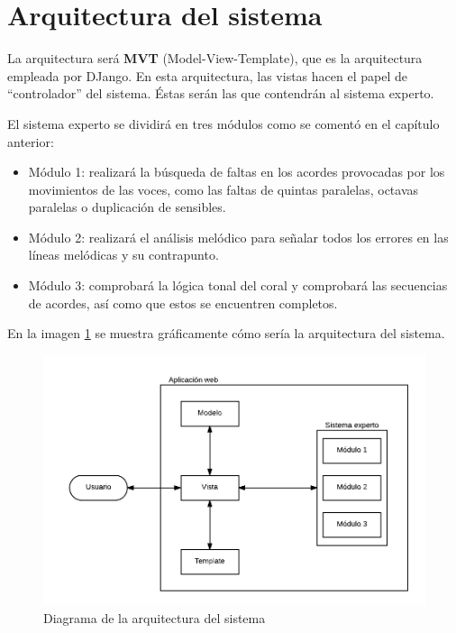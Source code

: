 \section{Arquitectura del sistema}

La arquitectura será \textbf{MVT} (Model-View-Template), que es la arquitectura empleada por DJango. En esta arquitectura, las vistas hacen el papel de ``controlador'' del sistema. Éstas serán las que contendrán al sistema experto.  

El sistema experto se dividirá en tres módulos como se comentó en el capítulo anterior:

\begin{itemize}

	\item Módulo 1: realizará la búsqueda de faltas en los acordes provocadas por los movimientos de las voces, como las faltas de quintas paralelas, octavas paralelas o duplicación de sensibles.

	\item Módulo 2: realizará el análisis melódico para señalar todos los errores en las líneas melódicas y su contrapunto.

	\item Módulo 3: comprobará la lógica tonal del coral y comprobará las secuencias de acordes, así como que estos se encuentren completos. 

\end{itemize}

En la imagen \ref{fig4.2.1} se muestra gráficamente cómo sería la arquitectura del sistema.

\begin{figure}[H]
	\centering
	\includegraphics[scale=1]{imagenes/arquitectura.png}
	\caption{Diagrama de la arquitectura del sistema}
	\label{fig4.2.1}
\end{figure}